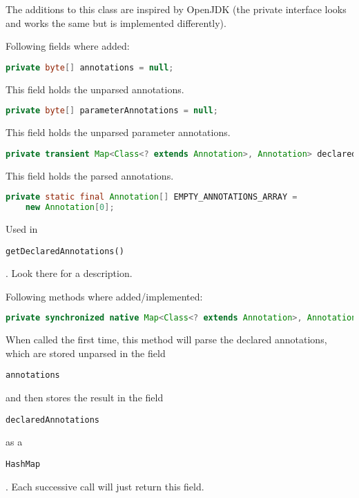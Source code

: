 \documentclass[a4paper, 10pt, titlepage]{scrartcl} %
\begin{document}
The additions to this class are inspired by OpenJDK (the private interface
looks and works the same but is implemented differently).

Following fields where added:
\begin{lstlisting}[language=Java,firstnumber=92]
  private byte[] annotations = null;
\end{lstlisting}
This field holds the unparsed annotations.

\begin{lstlisting}[language=Java,firstnumber=97]
  private byte[] parameterAnnotations = null;
\end{lstlisting}
This field holds the unparsed parameter annotations.

\begin{lstlisting}[language=Java,firstnumber=103]
  private transient Map<Class<? extends Annotation>, Annotation> declaredAnnotations = null;
\end{lstlisting}
This field holds the parsed annotations.

\begin{lstlisting}[language=Java,firstnumber=111]
  private static final Annotation[] EMPTY_ANNOTATIONS_ARRAY =
    new Annotation[0];
\end{lstlisting}
Used in \begin{scriptsize}\verb|getDeclaredAnnotations|\hspace{0.0pt}\verb|(|\hspace{0.0pt}\verb||\hspace{0.0pt}\verb|)|\hspace{0.0pt}\verb||\end{scriptsize}. Look there for a description.

Following methods where added/implemented:
\begin{lstlisting}[language=Java,firstnumber=443]
  private synchronized native Map<Class<? extends Annotation>, Annotation> declaredAnnotations();
\end{lstlisting}
When called the first time, this method will parse the declared annotations,
which are stored unparsed in the field \begin{scriptsize}\verb|annotations|\end{scriptsize} and then stores the
result in the field \begin{scriptsize}\verb|declaredAnnotations|\end{scriptsize} as a \begin{scriptsize}\verb|HashMap|\end{scriptsize}. Each successive
call will just return this field.
\end{document}
